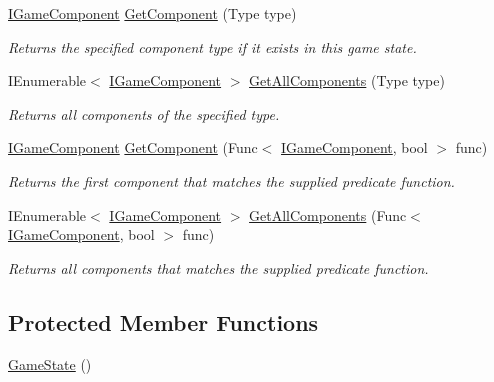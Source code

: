 \begin{DoxyCompactItemize}
\hyperlink{interface_tri_devs_1_1_tri_engine2_d_1_1_interfaces_1_1_i_game_component}{I\-Game\-Component} \hyperlink{class_tri_devs_1_1_tri_engine2_d_1_1_state_management_1_1_game_state_a26a8b145ad9d81584b379f2ff3bfb96c}{Get\-Component} (Type type)
\begin{DoxyCompactList}\small\item\em Returns the specified component type if it exists in this game state. \end{DoxyCompactList}\item 
I\-Enumerable$<$ \hyperlink{interface_tri_devs_1_1_tri_engine2_d_1_1_interfaces_1_1_i_game_component}{I\-Game\-Component} $>$ \hyperlink{class_tri_devs_1_1_tri_engine2_d_1_1_state_management_1_1_game_state_a8fa4417a8b9478dfec607a92270de936}{Get\-All\-Components} (Type type)
\begin{DoxyCompactList}\small\item\em Returns all components of the specified type. \end{DoxyCompactList}\item 
\hyperlink{interface_tri_devs_1_1_tri_engine2_d_1_1_interfaces_1_1_i_game_component}{I\-Game\-Component} \hyperlink{class_tri_devs_1_1_tri_engine2_d_1_1_state_management_1_1_game_state_a61f3c1e4d5cb7ad3e15b2bc8c79a0850}{Get\-Component} (Func$<$ \hyperlink{interface_tri_devs_1_1_tri_engine2_d_1_1_interfaces_1_1_i_game_component}{I\-Game\-Component}, bool $>$ func)
\begin{DoxyCompactList}\small\item\em Returns the first component that matches the supplied predicate function. \end{DoxyCompactList}\item 
I\-Enumerable$<$ \hyperlink{interface_tri_devs_1_1_tri_engine2_d_1_1_interfaces_1_1_i_game_component}{I\-Game\-Component} $>$ \hyperlink{class_tri_devs_1_1_tri_engine2_d_1_1_state_management_1_1_game_state_a177a6fd37f338568b7e72890bcf1f80f}{Get\-All\-Components} (Func$<$ \hyperlink{interface_tri_devs_1_1_tri_engine2_d_1_1_interfaces_1_1_i_game_component}{I\-Game\-Component}, bool $>$ func)
\begin{DoxyCompactList}\small\item\em Returns all components that matches the supplied predicate function. \end{DoxyCompactList}\end{DoxyCompactItemize}
\subsection*{Protected Member Functions}
\begin{DoxyCompactItemize}
\item 
\hyperlink{class_tri_devs_1_1_tri_engine2_d_1_1_state_management_1_1_game_state_a85c13247aa4ed19acf7ec750e4eb94df}{Game\-State} ()
\end{DoxyCompactItemize}
